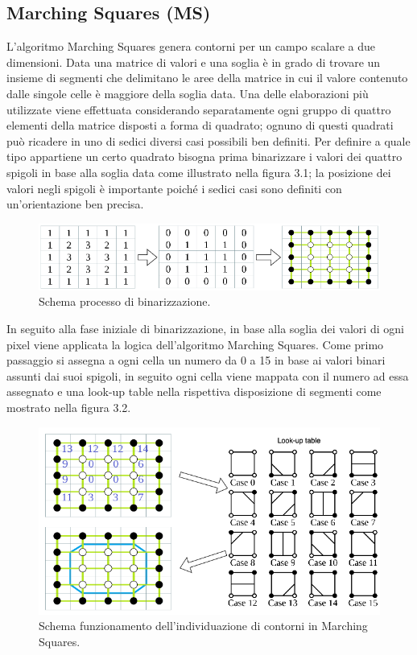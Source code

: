 \documentclass[12pt,a4paper]{report}
\begin{document}
\subsection{Marching Squares (MS)} %
L'algoritmo Marching Squares genera contorni per un campo scalare a due dimensioni. Data una matrice di valori e una soglia è in grado di trovare un insieme di segmenti che delimitano le aree della matrice in cui il valore contenuto dalle singole celle è maggiore della soglia data. 
Una delle elaborazioni più utilizzate viene effettuata considerando separatamente ogni gruppo di quattro elementi della matrice disposti a forma di quadrato; ognuno di questi quadrati può ricadere in uno di sedici diversi casi possibili ben definiti. Per definire a quale tipo appartiene un certo quadrato bisogna prima binarizzare i valori dei quattro spigoli in base alla soglia data come illustrato nella figura 3.1; la posizione dei valori negli spigoli è importante poiché i sedici casi sono definiti con un'orientazione ben precisa. 
\begin{figure}[H]
    \centering
    \includegraphics[scale=0.65]{img/MS2.drawio.png}
    \caption{Schema processo di binarizzazione.}
\end{figure} 
 In seguito alla fase iniziale di binarizzazione, in base alla soglia dei valori di ogni pixel viene applicata la logica dell'algoritmo Marching Squares. Come primo passaggio si assegna a ogni cella un numero da 0 a 15 in base ai valori binari assunti dai suoi spigoli, in seguito ogni cella viene mappata con il numero ad essa assegnato e una look-up table nella rispettiva disposizione di segmenti come mostrato nella figura 3.2.
\begin{figure}[H]
    \centering
    \includegraphics[scale=0.6]{img/MS.drawio.png}
    \caption{Schema funzionamento dell'individuazione di contorni in Marching Squares.}
\end{figure}
\end{document}
